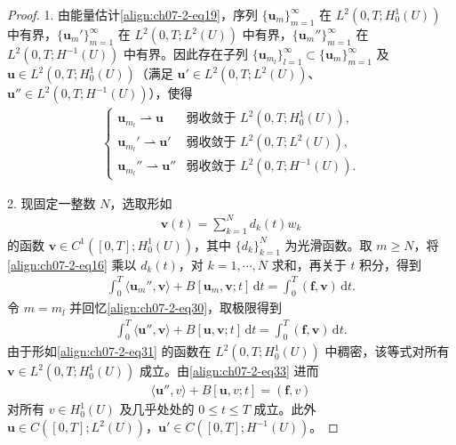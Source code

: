 \documentclass[../../main.tex]{subfiles}
\begin{document}
\begin{proof}
1. 由能量估计\eqref{align:ch07-2-eq19}，序列 $\{\mathbf{u}_m\}_{m=1}^\infty$ 在 $L^2(0,T;H^1_0(U))$ 中有界，$\{\mathbf{u}_m'\}_{m=1}^\infty$ 在 $L^2(0,T;L^2(U))$ 中有界，$\{\mathbf{u}_m''\}_{m=1}^\infty$ 在 $L^2(0,T;H^{-1}(U))$ 中有界。因此存在子列 $\{\mathbf{u}_{m_l}\}_{l=1}^\infty\subset\{\mathbf{u}_m\}_{m=1}^\infty$ 及 $\mathbf{u}\in L^2(0,T;H^1_0(U))$（满足 $\mathbf{u}'\in L^2(0,T;L^2(U))$、$\mathbf{u}''\in L^2(0,T;H^{-1}(U))$），使得
\begin{align}
\begin{cases}
\mathbf{u}_{m_l}\rightharpoonup \mathbf{u} & \text{弱收敛于 } L^2(0,T;H^1_0(U)),\\
\mathbf{u}_{m_l}'\rightharpoonup \mathbf{u}' & \text{弱收敛于 } L^2(0,T;L^2(U)),\\
\mathbf{u}_{m_l}''\rightharpoonup \mathbf{u}'' & \text{弱收敛于 } L^2(0,T;H^{-1}(U)).
\end{cases}\label{align:ch07-2-eq30}
\end{align}

2. 现固定一整数 $N$，选取形如
\begin{align}
\mathbf{v}(t)=\sum_{k=1}^N d_k(t)w_k\label{align:ch07-2-eq31}
\end{align}
的函数 $\mathbf{v}\in C^1([0,T];H^1_0(U))$，其中 $\{d_k\}_{k=1}^N$ 为光滑函数。取 $m\geqslant N$，将\eqref{align:ch07-2-eq16} 乘以 $d_k(t)$，对 $k=1,\cdots,N$ 求和，再关于 $t$ 积分，得到
\begin{align}
\int_0^T \langle\mathbf{u}_m'',\mathbf{v}\rangle+B[\mathbf{u}_m,\mathbf{v};t]\,\mathrm{d}t = \int_0^T (\mathbf{f},\mathbf{v})\,\mathrm{d}t.\label{align:ch07-2-eq32}
\end{align}
令 $m=m_l$ 并回忆\eqref{align:ch07-2-eq30}，取极限得到
\begin{align}
\int_0^T \langle\mathbf{u}'',\mathbf{v}\rangle+B[\mathbf{u},\mathbf{v};t]\,\mathrm{d}t = \int_0^T (\mathbf{f},\mathbf{v})\,\mathrm{d}t.\label{align:ch07-2-eq33}
\end{align}
由于形如\eqref{align:ch07-2-eq31} 的函数在 $L^2(0,T;H^1_0(U))$ 中稠密，该等式对所有 $\mathbf{v}\in L^2(0,T;H^1_0(U))$ 成立。由\eqref{align:ch07-2-eq33} 进而
\begin{align*}
\langle\mathbf{u}'',v\rangle+B[\mathbf{u},v;t]=(\mathbf{f},v)
\end{align*}
对所有 $v\in H^1_0(U)$ 及几乎处处的 $0\leqslant t\leqslant T$ 成立。此外 $\mathbf{u}\in C([0,T];L^2(U))$，$\mathbf{u}'\in C([0,T];H^{-1}(U))$。


\end{proof}
\end{document}
